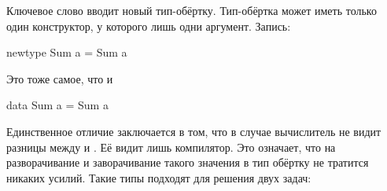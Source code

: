 Ключевое слово  вводит новый тип-обёртку.
Тип-обёртка может иметь только один конструктор, у
которого лишь одни аргумент. Запись:

\begin{code}
newtype Sum a = Sum a
\end{code}

Это тоже самое, что и 

\begin{code}
data Sum a = Sum a
\end{code}

Единственное отличие заключается в том, что
в случае  вычислитель не видит 
разницы между  и . Её видит
лишь компилятор. Это означает, что на разворачивание
и заворачивание такого значения в тип обёртку 
не тратится никаких усилий. Такие типы подходят для решения двух задач:


